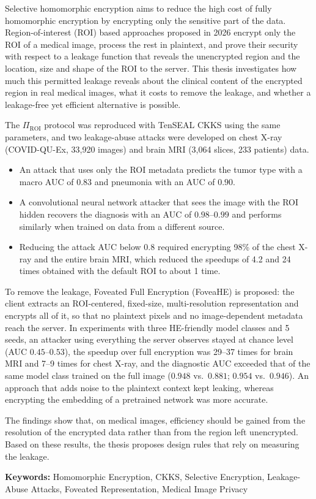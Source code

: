 Selective homomorphic encryption aims to reduce the high cost of fully homomorphic encryption by encrypting only the sensitive part of the data. Region-of-interest (ROI) based approaches proposed in 2026 encrypt only the ROI of a medical image, process the rest in plaintext, and prove their security with respect to a leakage function that reveals the unencrypted region and the location, size and shape of the ROI to the server. This thesis investigates how much this permitted leakage reveals about the clinical content of the encrypted region in real medical images, what it costs to remove the leakage, and whether a leakage-free yet efficient alternative is possible.

The $\Pi_{\mathrm{ROI}}$ protocol was reproduced with TenSEAL CKKS using the same parameters, and two leakage-abuse attacks were developed on chest X-ray (COVID-QU-Ex, 33,920 images) and brain MRI (3,064 slices, 233 patients) data.
\begin{itemize}
\item An attack that uses only the ROI metadata predicts the tumor type with a macro AUC of $0.83$ and pneumonia with an AUC of $0.90$.
\item A convolutional neural network attacker that sees the image with the ROI hidden recovers the diagnosis with an AUC of $0.98$--$0.99$ and performs similarly when trained on data from a different source.
\item Reducing the attack AUC below $0.8$ required encrypting 98\% of the chest X-ray and the entire brain MRI, which reduced the speedups of 4.2 and 24 times obtained with the default ROI to about 1 time.
\end{itemize}

To remove the leakage, Foveated Full Encryption (FoveaHE) is proposed: the client extracts an ROI-centered, fixed-size, multi-resolution representation and encrypts all of it, so that no plaintext pixels and no image-dependent metadata reach the server. In experiments with three HE-friendly model classes and 5 seeds, an attacker using everything the server observes stayed at chance level (AUC $0.45$--$0.53$), the speedup over full encryption was 29--37 times for brain MRI and 7--9 times for chest X-ray, and the diagnostic AUC exceeded that of the same model class trained on the full image ($0.948$ vs.\ $0.881$; $0.954$ vs.\ $0.946$). An approach that adds noise to the plaintext context kept leaking, whereas encrypting the embedding of a pretrained network was more accurate.

The findings show that, on medical images, efficiency should be gained from the resolution of the encrypted data rather than from the region left unencrypted. Based on these results, the thesis proposes design rules that rely on measuring the leakage.

\textbf{Keywords:} Homomorphic Encryption, CKKS, Selective Encryption, Leakage-Abuse Attacks, Foveated Representation, Medical Image Privacy

